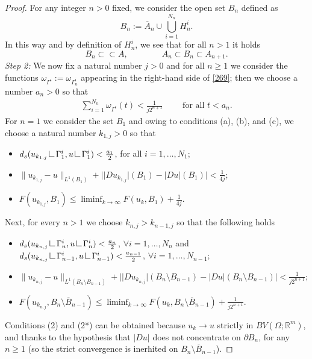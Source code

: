 \documentclass[a4paper,11pt]{article}
\numberwithin{equation}{section}
\newcommand{\Om}{\Omega}
\newcommand{\R}{\mathbb{R}}
\newcommand{\res}      {\mathop{\hbox{\vrule height 7pt width .5pt depth
                        0pt\vrule height .5pt width 6pt depth 0pt}}\nolimits}
\begin{document}
\begin{proof}
For any integer $n>0$ fixed, we consider the open set $B_n$ defined as $$B_n:=\overline A_n\cup \bigcup_{i=1}^{N_n}H_n^i.$$
In this way and by definition of $H_n^i$, we see that for all $n>1$ it holds 
$$B_n\subset\subset A,\qquad \qquad A_{n}\subset B_n\subset A_{n+1}.$$
\textit{Step 2:} We now fix a natural number $j>0$ and for all $n\geq 1$ we consider the functions $\omega_{\Gamma^i}:=\omega_{\Gamma_n^i}$ appearing in the right-hand side of \eqref{269}; then we choose a number $a_{n}>0$ so that 
\begin{align}\label{32}
\sum_{i=1}^{N_n}\omega_{\Gamma^i}(t)<\frac{1}{j2^{n+1}}\qquad \text{ for all }t<a_n.
\end{align}
For $n=1$ we consider the set $B_1$ and owing to conditions (a), (b), and (c), we choose a natural number $k_{1,j}>0$ so that 
\begin{itemize}
\item[(1)] $d_s(u_{k_{1,j}}\res \Gamma_1^i,u\res \Gamma_1^i)<\frac{a_1}{2}$, for all $i=1,\dots, N_1$;
\item[(2)] $\|u_{k_{1,j}}-u\|_{L^1(B_1)}+||Du_{k_{1,j}}|(B_1)-|Du|(B_1)|<\frac{1}{4j}$;
\item[(3)] $F(u_{k_{1,j}},B_1)\leq \liminf_{k\rightarrow \infty}F(u_k,B_1)+\frac{1}{4j}$.
\end{itemize}
Next, for every $n>1$ we  choose $k_{n,j}>k_{n-1,j}$ so that the following holds
\begin{itemize}
	\item[(1*)] $d_s(u_{k_{n,j}}\res \Gamma_n^i,u\res \Gamma_n^i)<\frac{a_n}{2}$, $\forall i=1,\dots, N_n$ and  $d_s(u_{k_{n,j}}\res \Gamma_{n-1}^i,u\res \Gamma_{n-1}^i)<\frac{a_{n-1}}{2}$, $\forall i=1,\dots, N_{n-1}$;
	\item[(2*)] $\|u_{k_{n,j}}-u\|_{L^1(B_n\setminus B_{n-1})}+||Du_{k_{n,j}}|(B_n\setminus B_{n-1})-|Du|(B_n\setminus B_{n-1})|<\frac{1}{j2^{n+1}}$;
	\item[(3*)] $F(u_{k_{n,j}},B_n\setminus \overline B_{n-1})\leq \liminf_{k\rightarrow \infty}F(u_k,B_n\setminus \overline B_{n-1})+\frac{1}{j2^{n+1}}$.
\end{itemize}
Conditions (2) and (2*) can be obtained because $u_k\rightarrow u$ strictly in $BV(\Om;\R^m)$, and thanks to the hypothesis that $|Du|$ does not concentrate on $\partial B_n$, for any $n\geq1$ (so the strict convergence is inerhited on $B_n\setminus \overline B_{n-1}$). 





\end{proof}
\end{document}
